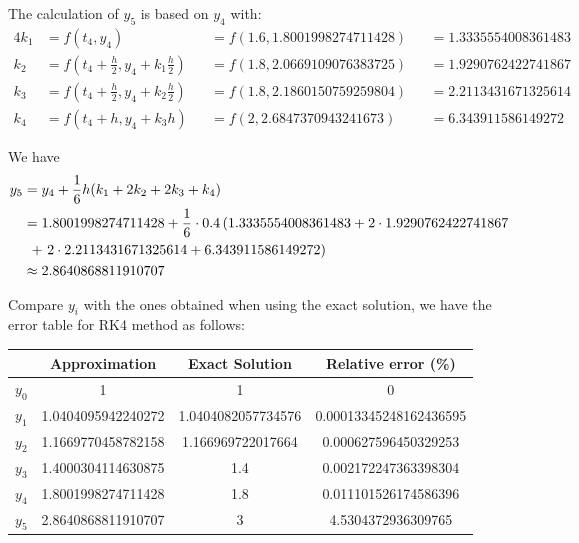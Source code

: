 \documentclass[a4paper]{article}
\numberwithin{equation}{section}
\begin{document}
The calculation of \( y_5 \) is based on \( y_4 \) with:
\begin{alignat*}{4}
  k_1 & = f(t_4, y_4)                                            &  & = f(1.6, 1.8001998274711428) &  & = 1.3335554008361483 \\
  k_2 & = f \left(t_4 + \frac{h}{2}, y_4 + k_1\frac{h}{2}\right) &  & = f(1.8, 2.0669109076383725) &  & = 1.9290762422741867 \\
  k_3 & = f \left(t_4 + \frac{h}{2}, y_4 + k_2\frac{h}{2}\right) &  & = f(1.8, 2.1860150759259804) &  & = 2.2113431671325614 \\
  k_4 & = f(t_4 + h, y_4 + k_3h)                                 &  & = f(2, 2.6847370943241673)   &  & = 6.343911586149272
\end{alignat*}

We have
\begin{align*}
  y_5 & = y_4 + \frac{1}{6}h(k_1 + 2k_2 + 2k_3 + k_4)                                                            \\
      & = 1.8001998274711428 + \frac{1}{6} \cdot 0.4\left(1.3335554008361483 + 2 \cdot 1.9290762422741867\right. \\
      & \ \left.+\ 2 \cdot 2.2113431671325614 + 6.343911586149272\vphantom{1}\right)                             \\
      & \approx 2.8640868811910707
\end{align*}

Compare \( y_i \) with the ones obtained when using the exact solution, we have the error table for RK4 method as follows:

\begin{table}[H]
  \centering
  \begin{tabular}{@{}cS[table-format=1.16]S[table-format=1.16]S[table-format=1.20]@{}}
    \toprule
    {}      & {Approximation}    & {Exact Solution}   & {Relative error (\%)}  \\
    \midrule
    \( y_0 \) & 1                  & 1                  & 0                      \\
    \( y_1 \) & 1.0404095942240272 & 1.0404082057734576 & 0.00013345248162436595 \\
    \( y_2 \) & 1.1669770458782158 & 1.166969722017664  & 0.000627596450329253   \\
    \( y_3 \) & 1.4000304114630875 & 1.4                & 0.002172247363398304   \\
    \( y_4 \) & 1.8001998274711428 & 1.8                & 0.011101526174586396   \\
    \( y_5 \) & 2.8640868811910707 & 3                  & 4.5304372936309765     \\
    \bottomrule
  \end{tabular}
\end{table}
\end{document}
